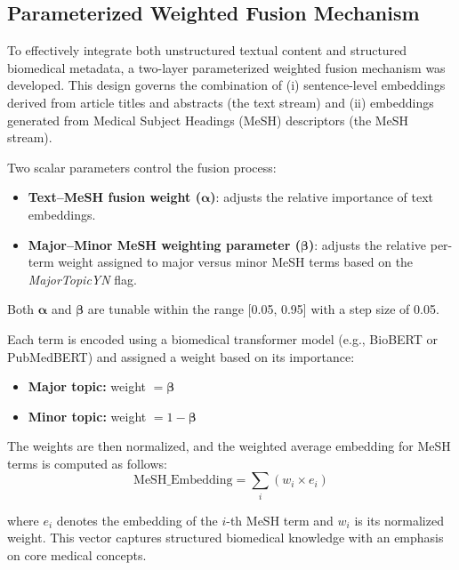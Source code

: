 \documentclass[authorproof,JACIII,researchpaper]{fujipressarticle}
\begin{document}
\subsection{Parameterized Weighted Fusion Mechanism}
To effectively integrate both unstructured textual content and structured biomedical metadata,
a two-layer parameterized weighted fusion mechanism was developed.
This design governs the combination of
(i) sentence-level embeddings derived from article titles and abstracts (the text stream) and
(ii) embeddings generated from Medical Subject Headings (MeSH) descriptors (the MeSH stream).

{\color{red}%
Two scalar parameters control the fusion process:
\begin{itemize}
    \item \textbf{Text--MeSH fusion weight ($\boldsymbol{\alpha}$)}: adjusts the relative importance of text embeddings.
    \item \textbf{Major--Minor MeSH weighting parameter ($\boldsymbol{\beta}$)}: adjusts the relative per-term weight assigned to major versus minor MeSH terms based on the \textit{MajorTopicYN} flag.
\end{itemize}
}%

Both $\boldsymbol{\alpha}$ and $\boldsymbol{\beta}$ are tunable within the range [0.05, 0.95] with a step size of 0.05.

Each term is encoded using a biomedical transformer model (e.g., BioBERT or PubMedBERT) and assigned a weight based on its importance:

\begin{itemize}
    \item \textbf{Major topic:} weight $= \boldsymbol{\beta}$
    \item \textbf{Minor topic:} weight $= 1 - \boldsymbol{\beta}$
\end{itemize}

The weights are then normalized, and the weighted average embedding for MeSH terms is computed as follows:
\begin{equation}
\text{MeSH\_Embedding} = \sum_i (w_i \times e_i)
\label{eq:mesh_embedding}
\end{equation}

where $e_i$ denotes the embedding of the $i$-th MeSH term and $w_i$ is its normalized weight.
This vector captures structured biomedical knowledge with an emphasis on core medical concepts.
\end{document}
